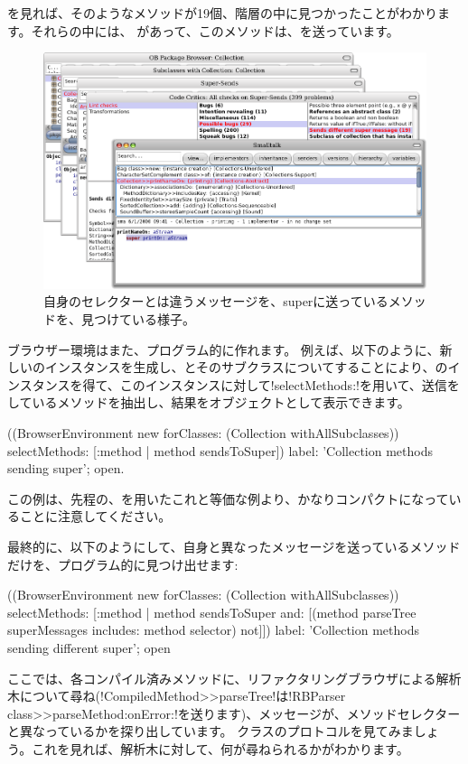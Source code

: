 \documentclass[a4paper,10pt,twoside]{book}
\begin{document}
を見れば、そのようなメソッドが19個、階層の中に見つかったことがわかります。それらの中には、 があって、このメソッドは、を送っています。
\begin{figure}[ht]\centering
	\includegraphics[width=\linewidth]{sendDifferentSuper}
	\caption{自身のセレクターとは違うメッセージを、superに送っているメソッドを、見つけている様子。}
\end{figure}

ブラウザー環境はまた、プログラム的に作れます。
例えば、以下のように、新しいのインスタンスを生成し、とそのサブクラスについてすることにより、のインスタンスを得て、このインスタンスに対して\ct!selectMethods:!を用いて、\super 送信をしているメソッドを抽出し、結果をオブジェクトとして表示できます。 %
\begin{code}{}
((BrowserEnvironment new forClasses: (Collection withAllSubclasses))
	selectMethods: [:method | method sendsToSuper])
	label: 'Collection methods sending super';
	open.
\end{code}{}

この例は、先程の、を用いたこれと等価な例より、かなりコンパクトになっていることに注意してください。

最終的に、以下のようにして、自身と異なった\super メッセージを送っているメソッドだけを、プログラム的に見つけ出せます:
\begin{code}{}
((BrowserEnvironment new forClasses: (Collection withAllSubclasses))
	selectMethods: [:method | 
		method sendsToSuper
		and: [(method parseTree superMessages includes: method selector) not]])
	label: 'Collection methods sending different super';
	open
\end{code}
ここでは、各コンパイル済みメソッドに、リファクタリングブラウザによる解析木について尋ね(\ct!CompiledMethod>>parseTree!は\ct!RBParser class>>parseMethod:onError:!を送ります)、\super メッセージが、メソッドセレクターと異なっているかを探り出しています。
クラスのプロトコルを見てみましょう。これを見れば、解析木に対して、何が尋ねられるかがわかります。 %
\end{document}
